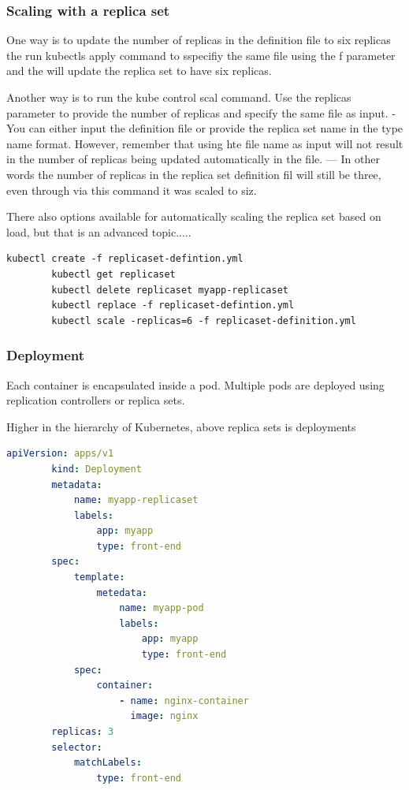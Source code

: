 \documentclass[11pt]{book}
\begin{document}
    \subsubsection{Scaling with a replica set}
    One way is to update the number of replicas in the definition file to six replicas the run kubectls apply command to sspecifiy the same file using the f parameter and the will update the replica set to have six replicas.

    Another way is to run the kube control scal command. Use the replicas parameter to provide the number of replicas and specify the same file as input.
    - You can either input the definition file or provide the replica set name in the type name format. However, remember that using hte file name as input will not result in the number of replicas being updated automatically in the file.
    --- In other words the number of replicas in the replica set definition fil will still be three, even through via this command it was scaled to siz.

    There also options available for automatically scaling the replica set based on load, but that is an advanced topic.....

    \begin{lstlisting}[language=terminal,caption={Pod commands}]
        kubectl create -f replicaset-defintion.yml
        kubectl get replicaset
        kubectl delete replicaset myapp-replicaset
        kubectl replace -f replicaset-defintion.yml
        kubectl scale -replicas=6 -f replicaset-definition.yml
    \end{lstlisting}

    \subsubsection{Deployment}
    Each container is encapsulated inside a pod.
    Multiple pods are deployed using replication controllers or replica sets.

    Higher in the hierarchy of Kubernetes, above replica sets is deployments

    \begin{lstlisting}[language=yaml, caption={Replication Set}]
        apiVersion: apps/v1
        kind: Deployment
        metadata:
            name: myapp-replicaset
            labels:
                app: myapp
                type: front-end
        spec:
            template:
                metedata:
                    name: myapp-pod
                    labels:
                        app: myapp
                        type: front-end
            spec:
                container:
                    - name: nginx-container
                      image: nginx
        replicas: 3
        selector:
            matchLabels:
                type: front-end
    \end{lstlisting}
\end{document}
